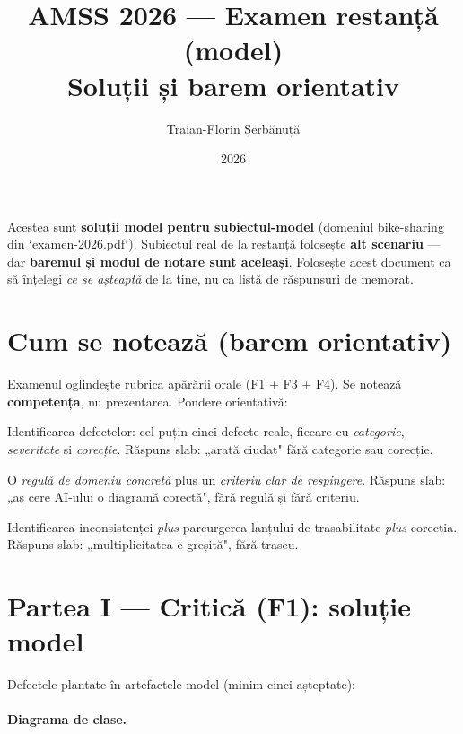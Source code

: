 \documentclass[12pt,a4paper]{article}
\title{AMSS 2026 — Examen restanță (model) \\ \large Soluții și barem orientativ}
\author{Traian-Florin Șerbănuță}
\date{2026}
\begin{document}
\maketitle

\begin{framed}
\noindent Acestea sunt \textbf{soluții model pentru subiectul-model}
(domeniul bike-sharing din `examen-2026.pdf`). Subiectul real de la
restanță folosește \textbf{alt scenariu} — dar \textbf{baremul și modul
de notare sunt aceleași}. Folosește acest document ca să înțelegi
\emph{ce se așteaptă} de la tine, nu ca listă de răspunsuri de memorat.
\end{framed}

\bigskip

\section*{Cum se notează (barem orientativ)}

Examenul oglindește rubrica apărării orale (F1 + F3 + F4). Se notează
\textbf{competența}, nu prezentarea. Pondere orientativă:

\begin{description}[leftmargin=4.5em,style=nextline]
  \item[Partea I (F1) — \char`~50\%] Identificarea defectelor: cel puțin
        cinci defecte reale, fiecare cu \emph{categorie}, \emph{severitate}
        și \emph{corecție}. Răspuns slab: „arată ciudat" fără categorie
        sau corecție.
  \item[Partea II (F3) — \char`~25\%] O \emph{regulă de domeniu concretă}
        plus un \emph{criteriu clar de respingere}. Răspuns slab: „aș cere
        AI-ului o diagramă corectă", fără regulă și fără criteriu.
  \item[Partea III (F4) — \char`~25\%] Identificarea inconsistenței
        \emph{plus} parcurgerea lanțului de trasabilitate \emph{plus}
        corecția. Răspuns slab: „multiplicitatea e greșită", fără traseu.
\end{description}

\section*{Partea I — Critică (F1): soluție model}

Defectele plantate în artefactele-model (minim cinci așteptate):

\paragraph{Diagrama de clase.}
\end{document}
